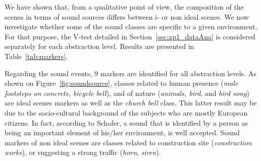 \documentclass[12pt]{elsarticle}
\newcommand{\cf}{cf.}
\begin{document}

We have shown that, from a qualitative point of view, the composition of the scenes in terms of sound sources differs between i- or non ideal scenes. We now investigate whether some of the sound classes are specific to a given environment. For that purpose, the V-test detailed in  Section~\ref{sec:xp1_dataAna} is considered separately for each abstraction level. Results are presented in Table~\ref{tab:markers}.


Regarding the sound events, 9 markers are identified for all abstraction levels. As shown on Figure~\ref{fig:soundsource}, classes related to human presence (\emph{male footsteps on concrete}, \emph{bicycle bell}), and of nature (\emph{animals, bird}, and \emph{bird song}) are ideal scenes markers as well as the \emph{church bell} class. This latter result may be due to the socio-cultural background of the subjects who are mostly European citizens. In fact, according to Schafer, a sound that is identified by a person as being an important element of his/her environment, is well accepted. Sound markers of non ideal scenes are classes related to construction site (\emph{construction works}), or suggesting a strong traffic (\emph{horn}, \emph{siren}).
\end{document}
